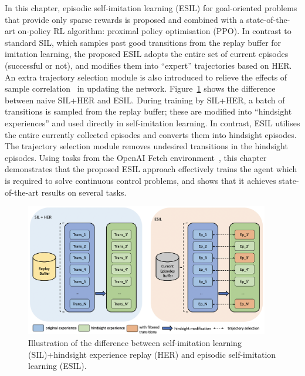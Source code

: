 In this chapter, {episodic self-imitation learning (ESIL) for goal-oriented problems that provide only sparse rewards is proposed and combined with a state-of-the-art on-policy RL algorithm:} proximal policy optimisation (PPO). In contrast to standard SIL, which samples past good transitions from the replay buffer for imitation learning, {the proposed} ESIL adopts the entire set of current episodes {(successful or not)}, and modifies them into ``expert'' trajectories based on HER. An extra trajectory selection module is also introduced to relieve the effects of sample correlation~\cite{lee2019sample} in updating the network. Figure~\ref{fig:esil} shows the difference between naive SIL+HER and ESIL. During training by SIL+HER, a batch of transitions is sampled from the replay buffer; these are modified into ``hindsight experiences'' and used directly in self-imitation learning. In contrast, ESIL utilises the entire currently collected episodes and converts them into hindsight episodes. The trajectory selection module removes undesired transitions in the hindsight episodes. Using tasks from the OpenAI Fetch environment~\cite{plappert2018multi}, this chapter demonstrates that the proposed ESIL approach effectively trains the agent which is required to solve continuous control problems, and shows that it achieves state-of-the-art results on several tasks.

\begin{figure}[t]
\centering
\includegraphics[width=0.95\textwidth]{figures/chapter3/buffer.png}
\caption{Illustration of the difference between self-imitation learning (SIL)+hindsight experience replay (HER) and episodic self-imitation learning (ESIL).}
\label{fig:esil}
\end{figure}

